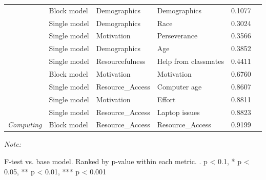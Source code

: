 \begin{table}[!h]
\begin{threeparttable}
\begin{tabular}[t]{>{}llllrl}
 & Block model & Demographics & Demographics & 0.1077 & \\

 & Single model & Demographics & Race & 0.3024 & \\

 & Single model & Motivation & Perseverance & 0.3566 & \\

 & Single model & Demographics & Age & 0.3852 & \\

 & Single model & Resourcefulness & Help from classmates & 0.4411 & \\

 & Block model & Motivation & Motivation & 0.6760 & \\

 & Single model & Resource_Access & Computer age & 0.8607 & \\

 & Single model & Motivation & Effort & 0.8811 & \\

 & Single model & Resource_Access & Laptop issues & 0.8823 & \\

\multirow[t]{-19}{*}[\normalbaselineskip]{\raggedright\arraybackslash \em{Computing}} & Block model & Resource_Access & Resource_Access & 0.9199 & \\
\bottomrule
\end{tabular}
\begin{tablenotes}[para]
\item \textit{Note: } 
\item F-test vs. base model. Ranked by p-value within each metric. . p < 0.1, * p < 0.05, ** p < 0.01, *** p < 0.001
\end{tablenotes}
\end{threeparttable}
\end{table}

